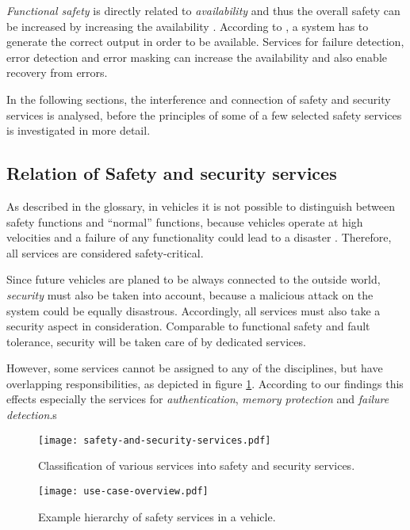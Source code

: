 \emph{Functional safety} is directly related to \emph{availability} and thus the overall safety can be increased by increasing the availability \cite{turek2011}. According to \cite{turek2011}, a system has to generate the correct output in order to be available. Services for failure detection, error detection and error masking can increase the availability and also enable recovery from errors.

In the following sections, the interference and connection of safety and security services is analysed, before the principles of some of a few selected safety services is investigated in more detail.

\subsection{Relation of Safety and security services}

As described in the glossary, in vehicles it is not possible to distinguish between safety functions and ``normal'' functions, because vehicles operate at high velocities and a failure of any functionality could lead to a disaster \cite{iso26262:course2}. Therefore, all services are considered safety-critical.

Since future vehicles are planed to be always connected to the outside world, \emph{security} must also be taken into account, because a malicious attack on the system could be equally disastrous. Accordingly, all services must also take a security aspect in consideration. Comparable to functional safety and fault tolerance, security will be taken care of by dedicated services.

However, some services cannot be assigned to any of the disciplines, but have overlapping responsibilities, as depicted in figure \ref{fig:safety-and-security-services}. According to our findings this effects especially the services for \emph{authentication}, \emph{memory protection} and \emph{failure detection}.s

\begin{figure}[ht]
\centering
\texttt{[image: safety-and-security-services.pdf]}
\caption{Classification of various services into safety and security services.}
\label{fig:safety-and-security-services}
\end{figure}

\begin{figure}[ht]
\centering
\texttt{[image: use-case-overview.pdf]}
\caption{Example hierarchy of safety services in a vehicle.}
\label{fig:safety-services}
\end{figure}




